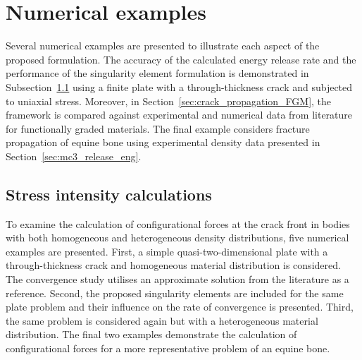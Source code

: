 \documentclass[onecolumn]{svjour3}
\begin{document}
\section{Numerical examples}
\label{sec:numerical_examples}
Several numerical examples are presented to illustrate each aspect of the proposed formulation. 
The accuracy of the calculated energy release rate and the performance of the singularity element formulation is demonstrated in Subsection~\ref{sec:release_energy_rate} using a finite plate with a through-thickness crack and subjected to uniaxial stress. Moreover, in Section~\ref{sec:crack_propagation_FGM}, 
the framework is compared against experimental and numerical data from literature for functionally graded materials.
The final example considers fracture propagation of equine bone using experimental density data presented in Section~\ref{sec:mc3_release_eng}. 
% 
% 
% 

\subsection{Stress intensity calculations}
\label{sec:release_energy_rate}
To examine the calculation of configurational forces at the crack front in bodies with both homogeneous and heterogeneous density distributions, five numerical examples are presented.
First, a simple quasi-two-dimensional plate with a through-thickness crack and homogeneous material distribution is considered.  The convergence study utilises an approximate solution from the literature as a reference.
Second, the proposed singularity elements are included for the same plate problem and their influence on the rate of convergence is presented. 
Third, the same problem is considered again but with a heterogeneous material distribution.
The final two examples demonstrate the calculation of configurational forces for a more representative problem of an equine bone.
 
\end{document}
